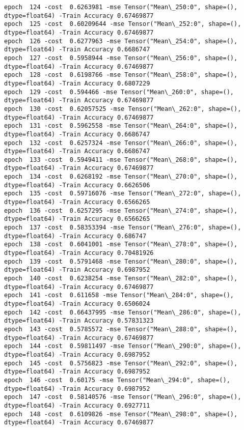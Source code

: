 \documentclass[11pt]{article}
\begin{document}
\begin{Verbatim}[commandchars=\\\{\}]
epoch  124 -cost  0.6263981 -mse Tensor("Mean\_250:0", shape=(), dtype=float64) -Train Accuracy 0.67469877
epoch  125 -cost  0.60209644 -mse Tensor("Mean\_252:0", shape=(), dtype=float64) -Train Accuracy 0.67469877
epoch  126 -cost  0.6277963 -mse Tensor("Mean\_254:0", shape=(), dtype=float64) -Train Accuracy 0.6686747
epoch  127 -cost  0.5958944 -mse Tensor("Mean\_256:0", shape=(), dtype=float64) -Train Accuracy 0.67469877
epoch  128 -cost  0.6198766 -mse Tensor("Mean\_258:0", shape=(), dtype=float64) -Train Accuracy 0.6807229
epoch  129 -cost  0.594466 -mse Tensor("Mean\_260:0", shape=(), dtype=float64) -Train Accuracy 0.67469877
epoch  130 -cost  0.62057525 -mse Tensor("Mean\_262:0", shape=(), dtype=float64) -Train Accuracy 0.67469877
epoch  131 -cost  0.5962558 -mse Tensor("Mean\_264:0", shape=(), dtype=float64) -Train Accuracy 0.6686747
epoch  132 -cost  0.6257324 -mse Tensor("Mean\_266:0", shape=(), dtype=float64) -Train Accuracy 0.6686747
epoch  133 -cost  0.5949411 -mse Tensor("Mean\_268:0", shape=(), dtype=float64) -Train Accuracy 0.67469877
epoch  134 -cost  0.6268192 -mse Tensor("Mean\_270:0", shape=(), dtype=float64) -Train Accuracy 0.6626506
epoch  135 -cost  0.59716076 -mse Tensor("Mean\_272:0", shape=(), dtype=float64) -Train Accuracy 0.6566265
epoch  136 -cost  0.6257295 -mse Tensor("Mean\_274:0", shape=(), dtype=float64) -Train Accuracy 0.6566265
epoch  137 -cost  0.58353394 -mse Tensor("Mean\_276:0", shape=(), dtype=float64) -Train Accuracy 0.686747
epoch  138 -cost  0.6041001 -mse Tensor("Mean\_278:0", shape=(), dtype=float64) -Train Accuracy 0.70481926
epoch  139 -cost  0.5791468 -mse Tensor("Mean\_280:0", shape=(), dtype=float64) -Train Accuracy 0.6987952
epoch  140 -cost  0.6238254 -mse Tensor("Mean\_282:0", shape=(), dtype=float64) -Train Accuracy 0.67469877
epoch  141 -cost  0.611658 -mse Tensor("Mean\_284:0", shape=(), dtype=float64) -Train Accuracy 0.6506024
epoch  142 -cost  0.66437995 -mse Tensor("Mean\_286:0", shape=(), dtype=float64) -Train Accuracy 0.57831323
epoch  143 -cost  0.5785572 -mse Tensor("Mean\_288:0", shape=(), dtype=float64) -Train Accuracy 0.67469877
epoch  144 -cost  0.59811497 -mse Tensor("Mean\_290:0", shape=(), dtype=float64) -Train Accuracy 0.6987952
epoch  145 -cost  0.5756823 -mse Tensor("Mean\_292:0", shape=(), dtype=float64) -Train Accuracy 0.6987952
epoch  146 -cost  0.60175 -mse Tensor("Mean\_294:0", shape=(), dtype=float64) -Train Accuracy 0.6987952
epoch  147 -cost  0.58140576 -mse Tensor("Mean\_296:0", shape=(), dtype=float64) -Train Accuracy 0.6927711
epoch  148 -cost  0.6109826 -mse Tensor("Mean\_298:0", shape=(), dtype=float64) -Train Accuracy 0.67469877

\end{Verbatim}
\end{document}
